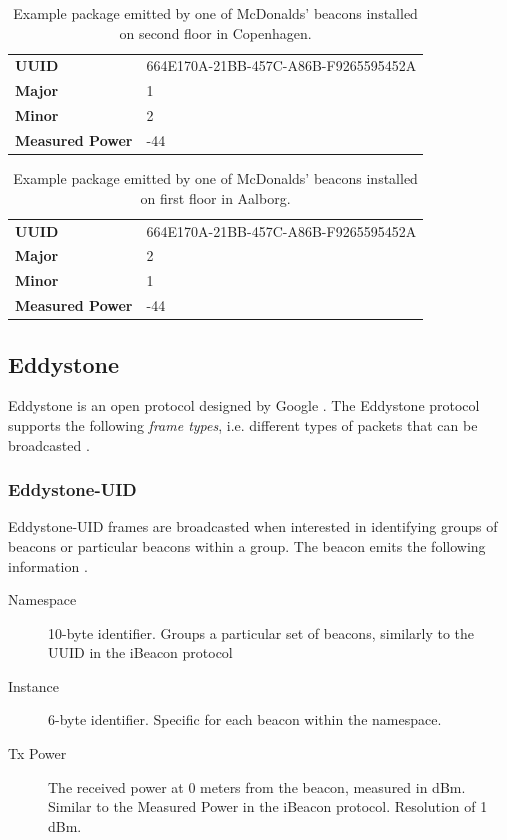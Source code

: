 \begin{table}[h!]
\centering
\caption{Example package emitted by one of McDonalds' beacons installed on second floor in Copenhagen.}
\label{tbl:design:ble-positioning:ibeacon2}
\begin{tabular}{ll}
\textbf{UUID}  & 664E170A-21BB-457C-A86B-F9265595452A \\
\textbf{Major} & 1                                    \\
\textbf{Minor} & 2           \\
\textbf{Measured Power} & -44                        
\end{tabular}
\end{table}

\begin{table}[h!]
\centering
\caption{Example package emitted by one of McDonalds' beacons installed on first floor in Aalborg.}
\label{tbl:design:ble-positioning:ibeacon3}
\begin{tabular}{ll}
\textbf{UUID}  & 664E170A-21BB-457C-A86B-F9265595452A \\
\textbf{Major} & 2                                    \\
\textbf{Minor} & 1            \\                        
\textbf{Measured Power} & -44
\end{tabular}
\end{table}

\subsection{Eddystone}

Eddystone is an open protocol designed by Google \cite{estimote:what-is-eddystone}. The Eddystone protocol supports the following \emph{frame types}, i.e. different types of packets that can be broadcasted \cite{eddystone:protocol-spec}.

\subsubsection{Eddystone-UID}

Eddystone-UID frames are broadcasted when interested in identifying groups of beacons or particular beacons within a group. The beacon emits the following information \cite{eddystone:protocol-uid-spec}.

\begin{description}
\item[Namespace] 10-byte identifier. Groups a particular set of beacons, similarly to the UUID in the iBeacon protocol
\item[Instance] 6-byte identifier. Specific for each beacon within the namespace.
\item[Tx Power] The received power at 0 meters from the beacon, measured in dBm. Similar to the Measured Power in the iBeacon protocol. Resolution of 1 dBm.
\end{description}

